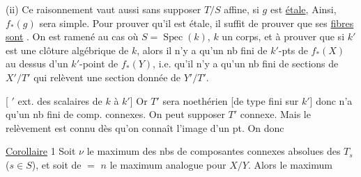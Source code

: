 (ii) Ce raisonnement vaut aussi sans supposer $T/S$ affine, si $g$ est \uline{étale},  Ainsi, $f_*(g)$ sera simple. Pour prouver qu'il est étale, il suffit de prouver que ses \uline{fibres sont}   .  On est ramené au cas où $S=\operatorname{Spec}(k)$, $k$ un corps, et à prouver que si $k'$ est une clôture algébrique de $k$, alors il n'y a qu'un nb fini de $k'$-pts de $f_*(X)$ au dessus d'un $k'$-point de $f_*(Y)$, i.e. qu'il n'y a qu'un nb fini de sections de $X'/T'$ qui relèvent une section donnée de $Y'/T'$.

[ $'$  ext. des scalaires de $k$ à $k'$]
Or $T'$ sera noethérien [de type fini sur $k'$] donc n'a qu'un nb fini de comp. connexes. On peut supposer $T'$ connexe. Mais le relèvement est connu dès qu'on connaît l'image d'un pt. On  donc

\uline{Corollaire} 1 Soit $\nu$ le maximum des nbs  de composantes connexes absolues des $T_s$ ($s\in S$), et soit de $=$ $n$ le maximum analogue pour $X/Y$. Alors le maximum
